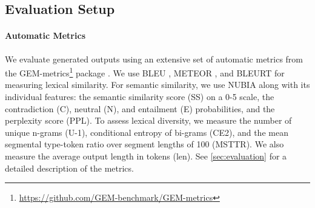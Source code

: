 \subsection{Evaluation Setup}
\paragraph{Automatic Metrics}


We evaluate generated outputs using an extensive set of automatic metrics from the GEM-metrics\footnote{\url{https://github.com/GEM-benchmark/GEM-metrics}} package \cite{gehrmannGEMBenchmarkNatural2021}. We use BLEU \cite{papineni2002bleu}, \mbox{METEOR} \cite{banerjee-lavie-2005-meteor}, and BLEURT \cite{sellam2020bleurt} for measuring lexical similarity. For semantic similarity, we use NUBIA \cite{kaneNUBIANeUralBased2020} along with its individual features: the semantic similarity score (SS) on a 0-5 scale, the contradiction (C), neutral (N), and entailment (E) probabilities, and the perplexity score (PPL). To assess lexical diversity, we measure the number of unique n-grams (U-1), conditional entropy of bi-grams (CE2), and the mean segmental type-token ratio over segment lengths of 100 (MSTTR). We also measure the average output length in tokens (len). See \autoref{sec:evaluation} for a detailed description of the metrics.



